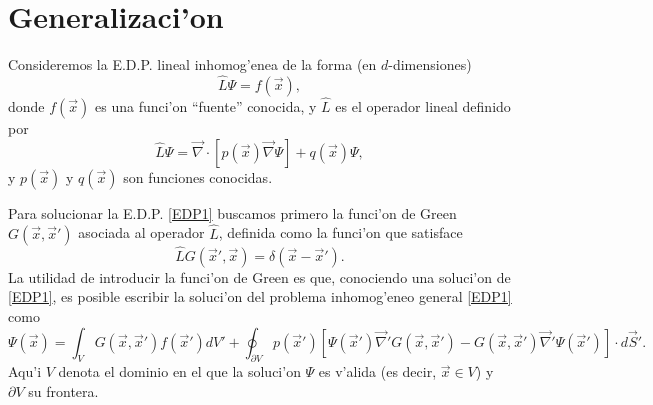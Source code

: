 \section{Generalizaci'on}
Consideremos la E.D.P. lineal inhomog'enea de la forma (en $d$-dimensiones)
\begin{equation}\label{EDP1}
\hat{L}\Psi=f(\vec{x}),
\end{equation}
donde $f(\vec{x})$ es una funci'on ``fuente'' conocida, y $\hat{L}$ es el operador lineal definido por
\begin{equation}
\hat{L}\Psi=\vec\nabla\cdot\left[p(\vec{x})\vec\nabla\Psi\right]+q(\vec{x})\Psi,
\end{equation}
y $p(\vec{x})$ y $q(\vec{x})$ son funciones conocidas.

Para solucionar la E.D.P. \eqref{EDP1} buscamos primero la funci'on de Green $G(\vec{x},\vec{x}')$ asociada al operador $\hat L$, definida como la funci'on que satisface
\begin{equation}\label{EDPG}
\hat{L}G(\vec{x}',\vec{x})=\delta(\vec{x}-\vec{x}').
\end{equation}
La utilidad de introducir la funci'on de Green es que, conociendo una soluci'on de \eqref{EDP1}, es posible escribir la soluci'on del problema inhomog'eneo general \eqref{EDP1} como
\begin{equation}\label{solLG}
\boxed{\Psi(\vec{x})=\int_VG(\vec{x},\vec{x}')f(\vec{x}')dV'+\oint_{\partial V}p(\vec{x}')\left[\Psi(\vec{x}')\vec\nabla' G(\vec{x},\vec{x}')
-G(\vec{x},\vec{x}')\vec\nabla'\Psi(\vec{x}')\right]\cdot d\vec{S}'.}
\end{equation}
Aqu'i $V$ denota el dominio en el que la soluci'on $\Psi$ es v'alida (es decir, $\vec{x}\in V$) y  $\partial V$ su frontera.

